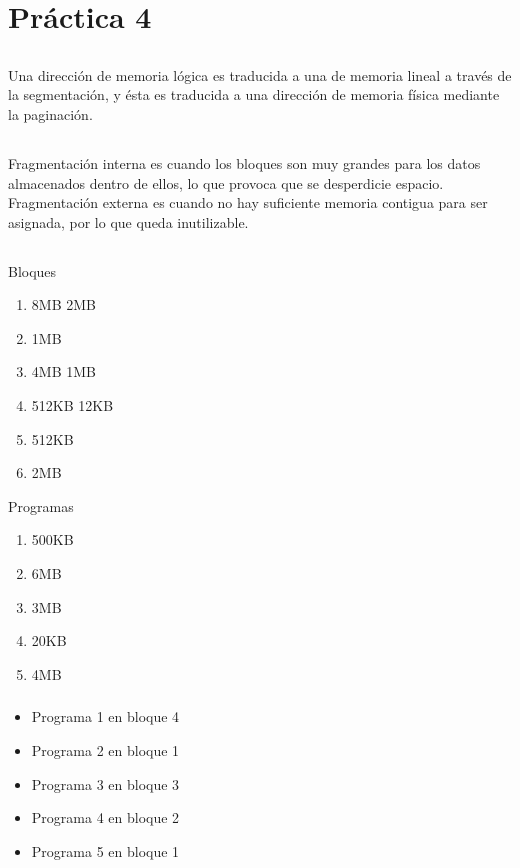 \section{Práctica 4}

\subsection{}

Una dirección de memoria lógica es traducida a una de memoria lineal a
través de la segmentación, y ésta es traducida a una dirección de memoria
física mediante la paginación.

\subsection{}

Fragmentación interna es cuando los bloques son muy grandes para los datos
almacenados dentro de ellos, lo que provoca que se desperdicie espacio.
Fragmentación externa es cuando no hay suficiente memoria contigua para ser
asignada, por lo que queda inutilizable.

\subsection{}

Bloques
\begin{enumerate}
	\item 8MB 2MB
	\item 1MB
	\item 4MB 1MB
	\item 512KB 12KB
	\item 512KB
	\item 2MB
\end{enumerate}

Programas
\begin{enumerate}
	\item 500KB
	\item 6MB
	\item 3MB
	\item 20KB
	\item 4MB
\end{enumerate}

\subsubsection{}

\begin{itemize}
	\item Programa 1 en bloque 4
	\item Programa 2 en bloque 1
	\item Programa 3 en bloque 3
	\item Programa 4 en bloque 2
	\item Programa 5 en bloque 1
\end{itemize}

